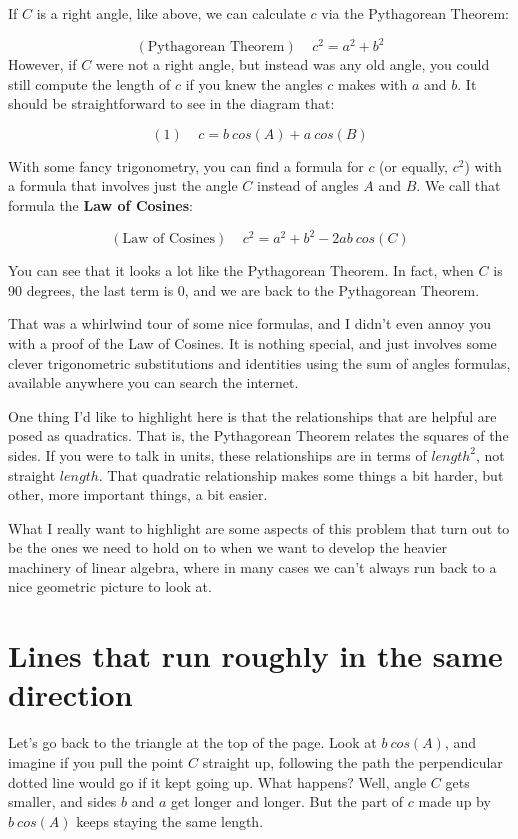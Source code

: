 \documentclass[
]{book}
\begin{document}
If \(C\) is a right angle, like above, we can calculate \(c\) via the Pythagorean Theorem:

\[(\text{Pythagorean Theorem}) \ \ \ \ \ c^2 = a^2 + b^2\]
However, if \(C\) were not a right angle, but instead was any old angle, you could still compute the length of \(c\) if you knew the angles \(c\) makes with \(a\) and \(b\). It should be straightforward to see in the diagram that:

\[(1) \ \ \ \ \ c = b \ cos(A) + a \ cos(B)\]

With some fancy trigonometry, you can find a formula for \(c\) (or equally, \(c^2\)) with a formula that involves just the angle \(C\) instead of angles \(A\) and \(B\). We call that formula the \textbf{Law of Cosines}:

\[(\text{Law of Cosines}) \ \ \ \ \ c^2 = a^2 + b^2 - 2 a b \ cos(C)\]

You can see that it looks a lot like the Pythagorean Theorem. In fact, when \(C\) is 90 degrees, the last term is \(0\), and we are back to the Pythagorean Theorem.

That was a whirlwind tour of some nice formulas, and I didn't even annoy you with a proof of the Law of Cosines. It is nothing special, and just involves some clever trigonometric substitutions and identities using the sum of angles formulas, available anywhere you can search the internet.

One thing I'd like to highlight here is that the relationships that are helpful are posed as quadratics. That is, the Pythagorean Theorem relates the squares of the sides. If you were to talk in units, these relationships are in terms of \(length^2\), not straight \(length\). That quadratic relationship makes some things a bit harder, but other, more important things, a bit easier.

What I really want to highlight are some aspects of this problem that turn out to be the ones we need to hold on to when we want to develop the heavier machinery of linear algebra, where in many cases we can't always run back to a nice geometric picture to look at.

\hypertarget{lines-that-run-roughly-in-the-same-direction}{%
\section{Lines that run roughly in the same direction}\label{lines-that-run-roughly-in-the-same-direction}}

Let's go back to the triangle at the top of the page. Look at \(b\ cos(A)\), and imagine if you pull the point \(C\) straight up, following the path the perpendicular dotted line would go if it kept going up. What happens? Well, angle \(C\) gets smaller, and sides \(b\) and \(a\) get longer and longer. But the part of \(c\) made up by \(b\ cos(A)\) keeps staying the same length.
\end{document}
